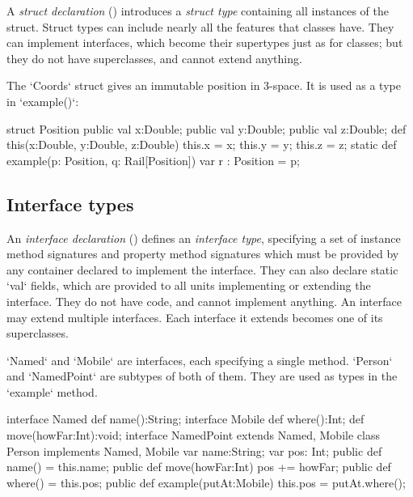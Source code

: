 A {\em struct declaration} () introduces a {\em struct type}
containing all instances of the struct.     Struct types can include nearly
all the features that classes have.  They can implement interfaces, which
become their supertypes just as for classes; but they do not have
superclasses, and cannot extend anything.  

\begin{ex}
The \xcd`Coords` struct  gives
an immutable position in 3-space.  It is used as a type in \xcd`example()`: 
\begin{xten}
struct Position {
  public val x:Double; public val y:Double; public val z:Double; 
  def this(x:Double, y:Double, z:Double) {
     this.x = x; this.y = y; this.z = z;
  }
  static def example(p: Position, q: Rail[Position]) {  
     var r : Position = p;
  }
}
\end{xten}
%
\end{ex}


\subsection{Interface types}
\label{InterfaceTypes}


An {\em interface declaration} () defines an {\em
interface type}, specifying a set of instance method signatures  and property
method signatures 
which must be provided by any container declared to implement the interface.
They can also declare static \xcd`val` fields, which are provided to all
units implementing or extending the interface.   They do not have code, and
cannot implement anything.
An interface may extend multiple interfaces.  
Each interface it extends becomes one of its superclasses.


\begin{ex}
\xcd`Named` and \xcd`Mobile` are interfaces, each specifying a single method.  
\xcd`Person` and \xcd`NamedPoint` are subtypes of both of them.  They are used
as types 
in the \xcd`example` method.
\begin{xten}
interface Named {
  def name():String;
}
interface Mobile {
  def where():Int;
  def move(howFar:Int):void;
}
interface NamedPoint extends Named, Mobile {} 
class Person implements Named, Mobile {
   var name:String; var pos: Int;
   public def name() = this.name; 
   public def move(howFar:Int) { pos += howFar; }
   public def where() = this.pos;
   public def example(putAt:Mobile) {
      this.pos = putAt.where();
   }
}

\end{xten}
%
\end{ex}




